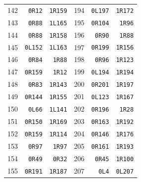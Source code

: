 \begin{center}
\begin{tabular}{rrr@{\hspace{22pt}}rrr}
142 & \texttt{0R12} & \texttt{1R159} & 194 & \texttt{0L197} & \texttt{1R172} \\
143 & \texttt{0R88} & \texttt{1L165} & 195 & \texttt{0R104} & \texttt{1R96} \\
144 & \texttt{0R88} & \texttt{1R158} & 196 & \texttt{0R90} & \texttt{1R88} \\
145 & \texttt{0L152} & \texttt{1L163} & 197 & \texttt{0R199} & \texttt{1R156} \\
146 & \texttt{0R84} & \texttt{1R88} & 198 & \texttt{0R96} & \texttt{1R123} \\
147 & \texttt{0R159} & \texttt{1R12} & 199 & \texttt{0L194} & \texttt{1R194} \\
148 & \texttt{0R83} & \texttt{1R143} & 200 & \texttt{0R201} & \texttt{1R197} \\
149 & \texttt{0R144} & \texttt{1R155} & 201 & \texttt{0L123} & \texttt{1R167} \\
150 & \texttt{0L66} & \texttt{1L141} & 202 & \texttt{0R196} & \texttt{1R28} \\
151 & \texttt{0R150} & \texttt{1R169} & 203 & \texttt{0R163} & \texttt{1R192} \\
152 & \texttt{0R159} & \texttt{1R114} & 204 & \texttt{0R146} & \texttt{1R176} \\
153 & \texttt{0R97} & \texttt{1R97} & 205 & \texttt{0R161} & \texttt{1R193} \\
154 & \texttt{0R49} & \texttt{0R32} & 206 & \texttt{0R45} & \texttt{1R100} \\
155 & \texttt{0R191} & \texttt{1R187} & 207 & \texttt{0L4} & \texttt{0L207} \\
\bottomrule\end{tabular}\end{center}
